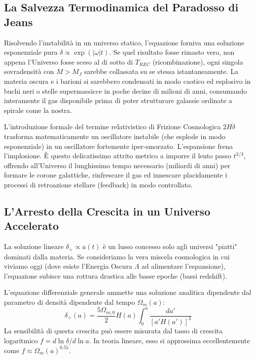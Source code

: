 \documentclass[11pt,a4paper]{report}
\begin{document}
\subsection{La Salvezza Termodinamica del Paradosso di Jeans}
Risolvendo l'instabilità in un universo statico, l'equazione forniva una soluzione esponenziale pura $\delta \propto \exp(|\omega|t)$. Se quel risultato fosse rimasto vero, non appena l'Universo fosse sceso al di sotto di $T_{REC}$ (ricombinazione), ogni singola sovradensità con $M > M_J$ sarebbe collassata su se stessa istantaneamente. La materia oscura e i barioni si sarebbero condensati in modo caotico ed esplosivo in buchi neri o stelle supermassicce in poche decine di milioni di anni, consumando interamente il gas disponibile prima di poter strutturare galassie ordinate a spirale come la nostra.

L'introduzione formale del termine relativistico di Frizione Cosmologica $2H\dot{\delta}$ trasforma matematicamente un oscillatore instabile (che esplode in modo esponenziale) in un oscillatore fortemente iper-smorzato. L'espansione frena l'implosione. È questo delicatissimo attrito metrico a imporre il lento passo $t^{2/3}$, offrendo all'Universo il lunghissimo tempo necessario (miliardi di anni) per formare le corone galattiche, rinfrescare il gas ed innescare placidamente i processi di retroazione stellare (feedback) in modo controllato.

\subsection{L'Arresto della Crescita in un Universo Accelerato}
La soluzione lineare $\delta_+ \propto a(t)$ è un lusso concesso solo agli universi "piatti" dominati dalla materia. Se consideriamo la vera miscela cosmologica in cui viviamo oggi (dove esiste l'Energia Oscura $\Lambda$ ad alimentare l'espansione), l'equazione subisce una rottura drastica alle basse epoche (bassi redshift).

L'equazione differenziale generale ammette una soluzione analitica dipendente dal parametro di densità dipendente dal tempo $\Omega_m(a)$:
\begin{equation}
\delta_+ (a) = \frac{5 \Omega_{m,0}}{2} H(a) \int_0^a \frac{da'}{[a' H(a')]^3}
\end{equation}
La sensibilità di questa crescita può essere misurata dal tasso di crescita logaritmico $f = d\ln\delta / d\ln a$. In teoria lineare, esso si approssima eccellentemente come $f \approx \Omega_m(a)^{0.55}$.
\end{document}
